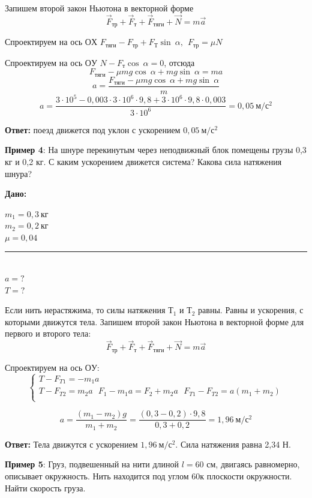 \documentclass[a6paper, 11pt]{diss_4}
\renewcommand{\'}{\,'}
\begin{document}
Запишем второй закон Ньютона в векторной форме
\[
\vec{F}_{тр}+\vec{F}_{т}+\vec{F}_{тяги}+\vec{N}=m\vec{a}
\]

Спроектируем на ось $ОХ$
$F_{тяги} - F_{тр}+F_Т \sin\ \alpha,\ \ F_{тр}=\mu N$

Спроектируем на ось $ОУ$
$N-F_т\cos\ \alpha=0$, отсюда
\[
F_{тяги}-\mu mg\cos\ \alpha+mg\sin\ \alpha=ma
\]
\[
a=\frac{F_{тяги}-\mu mg\cos\ \alpha+mg\sin\ \alpha}{m}
\]
\[
a=\frac{3\cdot 10^{5} -0,003\cdot 3\cdot 10^{6} \cdot 9,8+3\cdot 10^{6} \cdot 9,8\cdot 0,003}{3\cdot 10^{6} } =0,05\ м/с^{2}
\]

\textbf{Ответ:} поезд движется под уклон с ускорением $0,05\ м/с^{2}$

\textbf{Пример 4}: На шнуре перекинутым через неподвижный блок помещены грузы 0,3 кг и 0,2 кг. С каким ускорением движется система? Какова сила натяжения шнура?

\hspace{1cm}\textbf{Дано:}\hspace{.3cm}
\parbox[t]{4cm}{
$m_1 = 0,3\ кг$\\
$m_2 = 0,2\ кг$\\
$\mu = 0,04$\\
\rule{4cm}{.4pt}\\
$a = ?$\\
$T = ?$\\
}

Если нить нерастяжима, то силы натяжения $Т_1$ и $Т_2$ равны. Равны и ускорения, с которыми движутся тела. Запишем второй закон Ньютона в векторной форме для первого и второго тела:
\[
\vec{F}_{тр}+\vec{F}_{т}+\vec{F}_{тяги}+\vec{N}=m\vec{a}
\]

Спроектируем на ось $ОУ$:
\begin{equation*}
     \left\{
          \begin{array}{lr}
 T-F_{T1}=-m_1a\\
 T-F_{T2}= m_2a\ \ \ F_1-m_1a=F_2+m_2a\ \ \ F_{T1}-F_{T2}=a(m_1+m_2)\\
          \end{array}
     \right.
\end{equation*}

\[
a=\frac{\left(m_{{1}} -{m}_{{2}} \right){g}}{{m}_{{1}} +{m}_{{2}} } =\frac{\left(0,3-0,2\right)\cdot 9,8}{0,3+0,2} ={1,96}\ м/с^2
\]

\textbf{Ответ:} Тела движутся с ускорением ${1,96}\ м/с^2$. Сила натяжения равна 2,34 Н.

\textbf{Пример 5}: Груз, подвешенный на нити длиной $l=60$ см, двигаясь равномерно, описывает окружность. Нить находится под углом 60\textdegree к плоскости окружности. Найти скорость груза.
\end{document}
